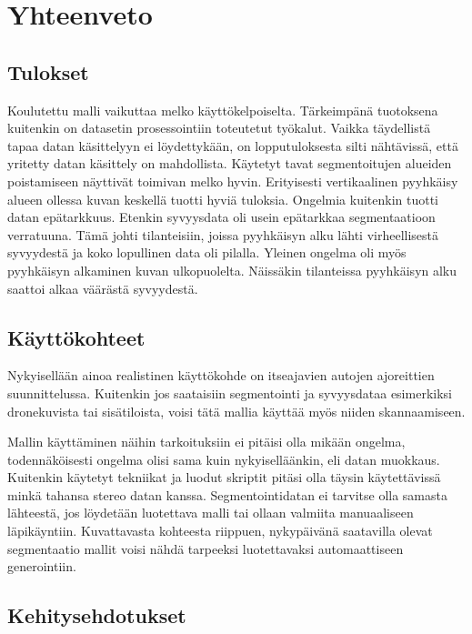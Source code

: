 \chapter{Yhteenveto}%
\label{ch:yhteenveto}

\section{Tulokset}

Koulutettu malli vaikuttaa melko käyttökelpoiselta. Tärkeimpänä tuotoksena kuitenkin on datasetin prosessointiin toteutetut työkalut. Vaikka täydellistä tapaa datan käsittelyyn ei löydettykään, on lopputuloksesta silti nähtävissä, että yritetty datan käsittely on mahdollista.
Käytetyt tavat segmentoitujen alueiden poistamiseen näyttivät toimivan melko hyvin.
Erityisesti vertikaalinen pyyhkäisy alueen ollessa kuvan keskellä tuotti hyviä tuloksia. 
Ongelmia kuitenkin tuotti datan epätarkkuus.
Etenkin syvyysdata oli usein epätarkkaa segmentaatioon verratuuna. Tämä johti tilanteisiin, joissa pyyhkäisyn alku lähti virheellisestä syvyydestä ja koko lopullinen data oli pilalla. Yleinen ongelma oli myös pyyhkäisyn alkaminen kuvan ulkopuolelta.
Näissäkin tilanteissa pyyhkäisyn alku saattoi alkaa väärästä syvyydestä.

\section{Käyttökohteet}

Nykyisellään ainoa realistinen käyttökohde on itseajavien autojen ajoreittien suunnittelussa. Kuitenkin jos saataisiin segmentointi ja syvyysdataa esimerkiksi dronekuvista tai sisätiloista, voisi tätä mallia käyttää myös niiden skannaamiseen.

Mallin käyttäminen näihin tarkoituksiin ei pitäisi olla mikään ongelma, todennäköisesti ongelma olisi sama kuin nykyiselläänkin, eli datan muokkaus.
Kuitenkin käytetyt tekniikat ja luodut skriptit pitäsi olla täysin käytettävissä minkä tahansa stereo datan kanssa.
Segmentointidatan ei tarvitse olla samasta lähteestä, jos löydetään luotettava malli tai ollaan valmiita manuaaliseen läpikäyntiin.
Kuvattavasta kohteesta riippuen, nykypäivänä saatavilla olevat segmentaatio mallit voisi nähdä tarpeeksi luotettavaksi automaattiseen generointiin.

\section{Kehitysehdotukset}


